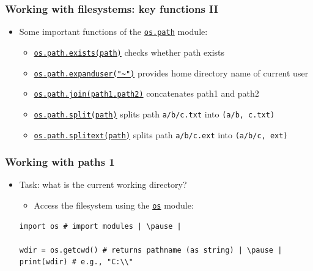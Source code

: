 \documentclass[xcolor=table]{beamer}
\begin{document}
\begin{frame}[fragile]
    \frametitle{Working with filesystems: key functions II}
        \begin{itemize}\addtolength{\itemsep}{\baselineskip}
            \item Some important functions of the \href{https://docs.python.org/3.7/library/os.html#module-os.path}{\texttt{os.path}} module:\pause
                \begin{itemize}\addtolength{\itemsep}{\baselineskip}
                        \item \href{https://docs.python.org/3.7/library/os.path.html#os.path.exists}{\texttt{os.path.exists(path)}} checks whether path exists \pause
                        \item \href{https://docs.python.org/3.7/library/os.path.html#os.path.expanduser}{\texttt{os.path.expanduser("\textasciitilde")}} provides home directory name of current user \pause
                        \item \href{https://docs.python.org/3.7/library/os.path.html#os.path.join}{\texttt{os.path.join(path1,path2)}} concatenates path1 and path2  \pause
                        \item \href{https://docs.python.org/3.7/library/os.path.html#os.path.split}{\texttt{os.path.split(path)}} splits path \texttt{a/b/c.txt} into \texttt{(a/b, c.txt)} \pause
                        \item \href{https://docs.python.org/3.7/library/os.path.html#os.path.splitext}{\texttt{os.path.splitext(path)}} splits path \texttt{a/b/c.ext} into \texttt{(a/b/c, ext)} \pause
                \end{itemize}
        \end{itemize}
\end{frame}



\begin{frame}[fragile]
    \frametitle{Working with paths 1}
    \begin{itemize}
        \item Task: what is the current working directory? 
            \begin{itemize}
                \item Access the filesystem using the \href{https://docs.python.org/3.7/library/os.html#module-os}{\texttt{os}} module: \pause
            \end{itemize}
\begin{lstlisting}[style=python]
import os # import modules | \pause |

wdir = os.getcwd() # returns pathname (as string) | \pause |
print(wdir) # e.g., "C:\\" 
\end{lstlisting}
    \end{itemize}
\end{frame}
\end{document}
